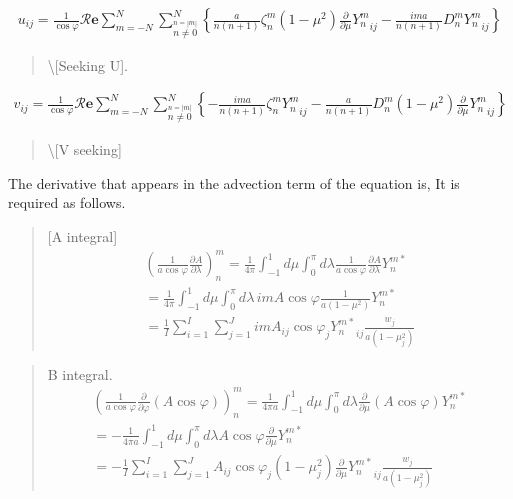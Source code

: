 \begin{eqnarray}
  u_{ij}
  = \frac{1}{\cos\varphi}
     {\mathcal R}\mathbf{e} \sum_{m=-N}^{N} 
                       \sum_{\stackrel{n=|m|}{n \neq 0}}^{N} 
    \left\{
             \frac{a}{n(n+1)} \zeta_n^m 
            (1-\mu^{2}) \frac{\partial }{\partial \mu} {Y_n^m}_{ij}
          -  \frac{im a}{n(n+1)} D_n^m {Y_n^m}_{ij}
    \right\}
\end{eqnarray}

\begin{quote}
\protect\hypertarget{Seekingux20U}{}{\textbackslash{[}Seeking U{]}}.
\end{quote}

\begin{eqnarray}
  v_{ij}
  = \frac{1}{\cos\varphi}
   {\mathcal R}\mathbf{e} \sum_{m=-N}^{N}
                     \sum_{\stackrel{n=|m|}{n \neq 0}}^{N}
    \left\{
          -  \frac{im a}{n(n+1)} \zeta_n^m {Y_n^m}_{ij}
          -  \frac{a}{n(n+1)} D_n^m 
            (1-\mu^{2}) \frac{\partial }{\partial \mu} {Y_n^m}_{ij}
    \right\}
\end{eqnarray}

\begin{quote}
\protect\hypertarget{Seekingux20V}{}{\textbackslash{[}V seeking{]}}
\end{quote}

The derivative that appears in the advection term of the equation is, It
is required as follows.

\begin{quote}
\protect\hypertarget{Aux20integral}{}{{[}A integral{]}} \begin{eqnarray}
\left( \frac{1}{a\cos\varphi} \frac{\partial A}{\partial \lambda} \right)_n^m 
=  \frac{1}{4 \pi} 
\int_{-1}^{1} d \mu \int_{0}^{\pi} d \lambda 
\frac{1}{a\cos\varphi} \frac{\partial A}{\partial \lambda} Y_n^{m *} \\
=  \frac{1}{4 \pi} 
\int_{-1}^{1} d \mu \int_{0}^{\pi} d \lambda \,
im A \cos\varphi \frac{1}{a(1-\mu^{2})} Y_n^{m *} \\
=  \frac{1}{I} \sum_{i=1}^{I} \sum_{j=1}^{J}  
im A_{ij} \cos\varphi_j
{Y_n^{m *}}_{ij} \frac{w_j}{a(1-\mu_j^{2})} 
\end{eqnarray}
\end{quote}

\begin{quote}
\protect\hypertarget{Bux20integral}{}{B integral\blazer\blazer{]}}. \begin{eqnarray}
\left( \frac{1}{a\cos\varphi} 
\frac{\partial }{\partial \varphi} (A\cos\varphi) \right)_n^m 
=  \frac{1}{4 \pi a} 
\int_{-1}^{1} d \mu \int_{0}^{\pi} d \lambda 
\frac{\partial }{\partial \mu} (A\cos\varphi) Y_n^{m *}  \\
=  - \frac{1}{4 \pi a} 
\int_{-1}^{1} d \mu \int_{0}^{\pi} d \lambda 
A \cos\varphi \frac{\partial }{\partial \mu} Y_n^{m *}
\\
=  - \frac{1}{I} \sum_{i=1}^{I} \sum_{j=1}^{J}  
A_{ij}  \cos\varphi_j
(1-\mu_j^2)  \frac{\partial }{\partial \mu} 
{Y_n^{m *}}_{ij} \frac{w_j}{a(1-\mu_j^{2})} 
\end{eqnarray}
\end{quote}

